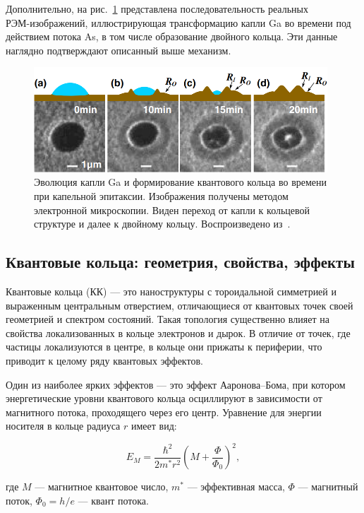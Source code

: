 \documentclass[14pt,oneside]{extarticle}
\begin{document}
Дополнительно, на рис.~\ref{fig:zhou1} представлена последовательность реальных \\ РЭМ-изображений, иллюстрирующая трансформацию капли Ga во времени под действием потока As, в том числе образование двойного кольца. Эти данные наглядно подтверждают описанный выше механизм.

\begin{figure}[H]
    \begin{center}
        \includegraphics[width=11cm]{images/Zhou1-Firgure1.png}
        \caption{\label{fig:zhou1}
            Эволюция капли Ga и формирование квантового кольца во времени при капельной эпитаксии. Изображения получены методом электронной микроскопии. Виден переход от капли к кольцевой структуре и далее к двойному кольцу. Воспроизведено из~\cite{zhou2013}.}
    \end{center}
\end{figure}

\subsection{Квантовые кольца: геометрия, свойства, эффекты}

Квантовые кольца (КК) — это наноструктуры с тороидальной симметрией и выраженным центральным отверстием, отличающиеся от квантовых точек своей геометрией и спектром состояний. Такая топология существенно влияет на свойства локализованных в кольце электронов и дырок. В отличие от точек, где частицы локализуются в центре, в кольце они прижаты к периферии, что приводит к целому ряду квантовых эффектов.

Один из наиболее ярких эффектов — это эффект Ааронова–Бома, при котором энергетические уровни квантового кольца осциллируют в зависимости от магнитного потока, проходящего через его центр. Уравнение для энергии носителя в кольце радиуса $r$ имеет вид:

\[
E_M = \frac{\hbar^2}{2m^* r^2} \left( M + \frac{\Phi}{\Phi_0} \right)^2,
\]

где $M$ — магнитное квантовое число, $m^*$ — эффективная масса, $\Phi$ — магнитный поток, $\Phi_0 = h/e$ — квант потока.
\end{document}
